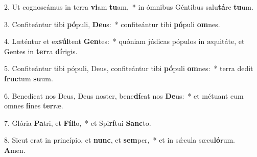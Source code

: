 2. Ut cognoscámus in terra \textbf{vi}am \textbf{tu}am,~*  in ómnibus Géntibus salu\textbf{tá}re \textbf{tu}um.\

3. Confiteántur tibi \textbf{pó}puli, \textbf{De}us:~*  confiteántur tibi \textbf{pó}puli \textbf{om}nes.\

4. Læténtur et ex\textbf{súl}tent \textbf{Gen}tes:~*  quóniam júdicas pópulos in æquitáte, et Gentes in \textbf{ter}ra \textbf{dí}rigis.\

5. Confiteántur tibi pópuli, Deus, confiteántur tibi \textbf{pó}puli \textbf{om}nes:~*  terra dedit \textbf{fruc}tum \textbf{su}um.\

6. Benedícat nos Deus, Deus noster, bene\textbf{dí}cat nos \textbf{De}us:~*  et métuant eum omnes \textbf{fi}nes \textbf{ter}ræ.\

7. Glória \textbf{Pa}tri, et \textbf{Fí}\textbf{li}o,~*  et Spi\textbf{rí}tui \textbf{Sanc}to.\

8. Sicut erat in princípio, et \textbf{nunc}, et \textbf{sem}per,~*  et in sǽcula sæcu\textbf{ló}rum. \textbf{A}men.\

